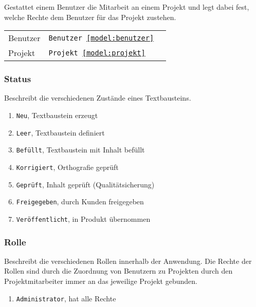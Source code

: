 Gestattet einem Benutzer die Mitarbeit an einem Projekt und legt dabei fest, welche Rechte dem Benutzer für das Projekt zustehen.

\begin{tabular}{@{}l l l}
\hline
Benutzer&\texttt{Benutzer \ref{model:benutzer}}&\\
Projekt&\texttt{Projekt \ref{model:projekt}}&\\
\hline
\end{tabular}

\subsubsection{Status}\label{model:status}

Beschreibt die verschiedenen Zustände eines Textbausteins.

\begin{enumerate}\itemsep -5pt
\item \texttt{Neu}, Textbaustein erzeugt
\item \texttt{Leer}, Textbaustein definiert
\item \texttt{Befüllt}, Textbaustein mit Inhalt befüllt
\item \texttt{Korrigiert}, Orthografie geprüft
\item \texttt{Geprüft}, Inhalt geprüft (Qualitätsicherung)
\item \texttt{Freigegeben}, durch Kunden freigegeben
\item \texttt{Veröffentlicht}, in Produkt übernommen
\end{enumerate}

\subsubsection{Rolle}\label{model:rolle}

Beschreibt die verschiedenen Rollen innerhalb der Anwendung. Die Rechte der Rollen sind durch die Zuordnung von Benutzern zu Projekten durch den Projektmitarbeiter immer an das jeweilige Projekt gebunden.

\begin{enumerate}\itemsep -5pt
\item \texttt{Administrator}, hat alle Rechte 
\end{enumerate}